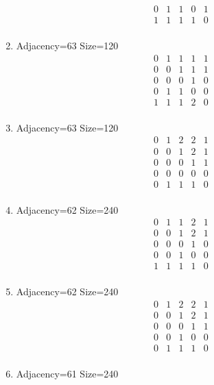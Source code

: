 \documentclass[12pt]{article}
\begin{document}
\begin{multicols}{3}
\begin{enumerate}
\begin{equation*}
\begin{array}{ccccc}
0&1&1&0&1\\
1&1&1&1&0\\
\end{array}
\end{equation*}
\item Adjacency=63 Size=120
\begin{equation*}
\begin{array}{ccccc}
0&1&1&1&1\\
0&0&1&1&1\\
0&0&0&1&0\\
0&1&1&0&0\\
1&1&1&2&0\\
\end{array}
\end{equation*}
\item Adjacency=63 Size=120
\begin{equation*}
\begin{array}{ccccc}
0&1&2&2&1\\
0&0&1&2&1\\
0&0&0&1&1\\
0&0&0&0&0\\
0&1&1&1&0\\
\end{array}
\end{equation*}
\item Adjacency=62 Size=240
\begin{equation*}
\begin{array}{ccccc}
0&1&1&2&1\\
0&0&1&2&1\\
0&0&0&1&0\\
0&0&1&0&0\\
1&1&1&1&0\\
\end{array}
\end{equation*}
\item Adjacency=62 Size=240
\begin{equation*}
\begin{array}{ccccc}
0&1&2&2&1\\
0&0&1&2&1\\
0&0&0&1&1\\
0&0&1&0&0\\
0&1&1&1&0\\
\end{array}
\end{equation*}
\item Adjacency=61 Size=240
\begin{equation*}
\begin{array}{ccccc}

\end{array}
\end{equation*}
\end{enumerate}
\end{multicols}
\end{document}
